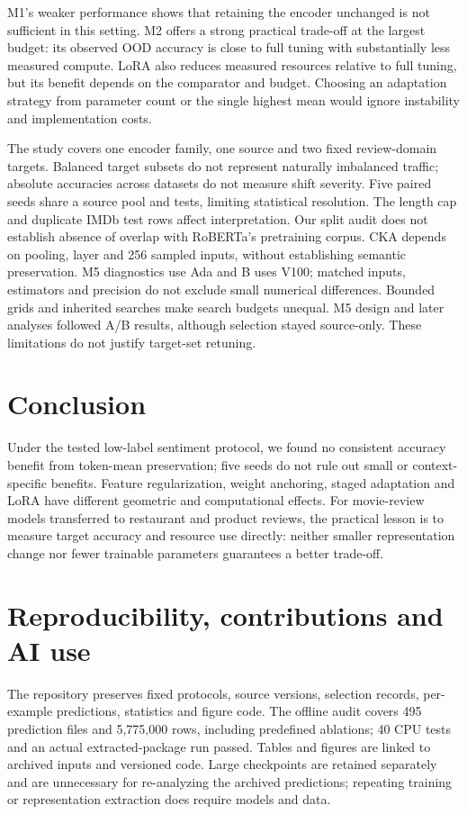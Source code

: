 \documentclass[a4paper,10pt]{article}
\begin{document}
M1's weaker performance shows that retaining the encoder unchanged is not sufficient in this setting. M2 offers a strong practical trade-off at the largest budget: its observed OOD accuracy is close to full tuning with substantially less measured compute. LoRA also reduces measured resources relative to full tuning, but its benefit depends on the comparator and budget. Choosing an adaptation strategy from parameter count or the single highest mean would ignore instability and implementation costs.

The study covers one encoder family, one source and two fixed review-domain targets. Balanced target subsets do not represent naturally imbalanced traffic; absolute accuracies across datasets do not measure shift severity. Five paired seeds share a source pool and tests, limiting statistical resolution. The length cap and duplicate IMDb test rows affect interpretation. Our split audit does not establish absence of overlap with RoBERTa's pretraining corpus. CKA depends on pooling, layer and 256 sampled inputs, without establishing semantic preservation. M5 diagnostics use Ada and B uses V100; matched inputs, estimators and precision do not exclude small numerical differences. Bounded grids and inherited searches make search budgets unequal. M5 design and later analyses followed A/B results, although selection stayed source-only. These limitations do not justify target-set retuning.

\section{Conclusion}
Under the tested low-label sentiment protocol, we found no consistent accuracy benefit from token-mean preservation; five seeds do not rule out small or context-specific benefits. Feature regularization, weight anchoring, staged adaptation and LoRA have different geometric and computational effects. For movie-review models transferred to restaurant and product reviews, the practical lesson is to measure target accuracy and resource use directly: neither smaller representation change nor fewer trainable parameters guarantees a better trade-off.

\section{Reproducibility, contributions and AI use}
The repository preserves fixed protocols, source versions, selection records, per-example predictions, statistics and figure code. The offline audit covers 495 prediction files and 5,775,000 rows, including predefined ablations; 40 CPU tests and an actual extracted-package run passed. Tables and figures are linked to archived inputs and versioned code. Large checkpoints are retained separately and are unnecessary for re-analyzing the archived predictions; repeating training or representation extraction does require models and data.
\end{document}
